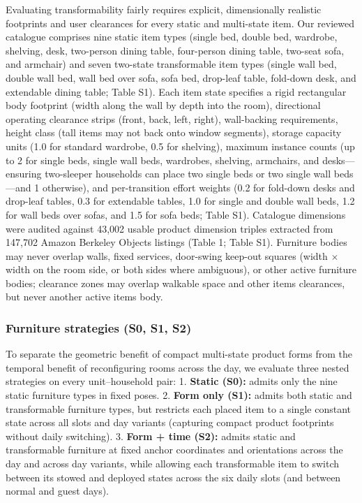 \documentclass[12pt,letterpaper]{article}
\newcommand{\SubmissionCite}[1]{\unskip\citep{#1}}
\begin{document}
Evaluating transformability fairly requires explicit, dimensionally realistic footprints and user clearances for every static and multi-state item. Our reviewed catalogue comprises nine static item types (single bed, double bed, wardrobe, shelving, desk, two-person dining table, four-person dining table, two-seat sofa, and armchair) and seven two-state transformable item types (single wall bed, double wall bed, wall bed over sofa, sofa bed, drop-leaf table, fold-down desk, and extendable dining table; Table S1). Each item state specifies a rigid rectangular body footprint (width along the wall by depth into the room), directional operating clearance strips (front, back, left, right), wall-backing requirements, height class (tall items may not back onto window segments), storage capacity units (1.0 for standard wardrobe, 0.5 for shelving), maximum instance counts (up to 2 for single beds, single wall beds, wardrobes, shelving, armchairs, and desks---ensuring two-sleeper households can place two single beds or two single wall beds---and 1 otherwise), and per-transition effort weights (0.2 for fold-down desks and drop-leaf tables, 0.3 for extendable tables, 1.0 for single and double wall beds, 1.2 for wall beds over sofas, and 1.5 for sofa beds; Table S1). Catalogue dimensions were audited against 43,002 usable product dimension triples extracted from 147,702 Amazon Berkeley Objects listings \SubmissionCite{collins2022abo} (Table 1; Table S1). Furniture bodies may never overlap walls, fixed services, door-swing keep-out squares (width \(\times\) width on the room side, or both sides where ambiguous), or other active furniture bodies; clearance zones may overlap walkable space and other items\textquotesingle{} clearances, but never another active item\textquotesingle s body.

\subsubsection{Furniture strategies (S0, S1, S2)}\label{furniture-strategies-s0-s1-s2}

To separate the geometric benefit of compact multi-state product forms from the temporal benefit of reconfiguring rooms across the day, we evaluate three nested strategies on every unit--household pair: 1. \textbf{Static (S0):} admits only the nine static furniture types in fixed poses. 2. \textbf{Form only (S1):} admits both static and transformable furniture types, but restricts each placed item to a single constant state across all slots and day variants (capturing compact product footprints without daily switching). 3. \textbf{Form + time (S2):} admits static and transformable furniture at fixed anchor coordinates and orientations across the day and across day variants, while allowing each transformable item to switch between its stowed and deployed states across the six daily slots (and between normal and guest days).
\end{document}
